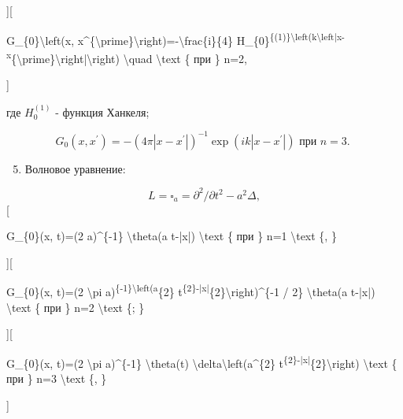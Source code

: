 \documentclass[10pt]{article}
\begin{document}
][



G\_\{0\}\textbackslash left(x, x\^{}\{\textbackslash prime\}\textbackslash right)=-\textbackslash frac\{i\}\{4\} H\_\{0\}\textsuperscript{\{(1)\}\textbackslash left(k\textbackslash left|x-x}\{\textbackslash prime\}\textbackslash right|\textbackslash right) \textbackslash quad \textbackslash text \{ при \} n=2,

]



где $H_{0}^{(1)}$ - функция Ханкеля;



\[

G_{0}\left(x, x^{\prime}\right)=-\left(4 \pi\left|x-x^{\prime}\right|\right)^{-1} \exp \left(i k\left|x-x^{\prime}\right|\right) \text { при } n=3 \text {. }

\]



\begin{enumerate}

  \setcounter{enumi}{4}

  \item Волновое уравнение:

\end{enumerate}



\[

L=\square_{a}=\partial^{2} / \partial t^{2}-a^{2} \Delta,

\][



G\_\{0\}(x, t)=(2 a)\^{}\{-1\} \textbackslash theta(a t-|x|) \textbackslash text \{ при \} n=1 \textbackslash text \{, \}



][



G\_\{0\}(x, t)=(2 \textbackslash pi a)\textsuperscript{\{-1\}\textbackslash left(a}\{2\} t\textsuperscript{\{2\}-|x|}\{2\}\textbackslash right)\^{}\{-1 / 2\} \textbackslash theta(a t-|x|) \textbackslash text \{ при \} n=2 \textbackslash text \{; \}



][



G\_\{0\}(x, t)=(2 \textbackslash pi a)\^{}\{-1\} \textbackslash theta(t) \textbackslash delta\textbackslash left(a\^{}\{2\} t\textsuperscript{\{2\}-|x|}\{2\}\textbackslash right) \textbackslash text \{ при \} n=3 \textbackslash text \{, \}

]
\end{document}

